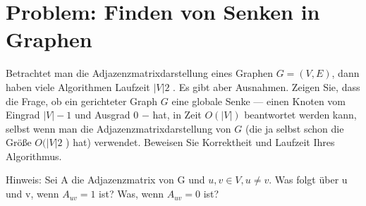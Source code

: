 \section{Problem: Finden von Senken in Graphen}

Betrachtet man die Adjazenzmatrixdarstellung eines Graphen $G = (V, E)$, dann
haben viele Algorithmen Laufzeit $|V|2$ . Es gibt aber Ausnahmen. Zeigen Sie, dass
die Frage, ob ein gerichteter Graph $G$ eine globale Senke — einen Knoten vom
Eingrad $|V | - 1$ und Ausgrad 0 $-$ hat, in Zeit $O(|V|)$ beantwortet werden kann,
selbst wenn man die Adjazenzmatrixdarstellung von $G$ (die ja selbst schon die Größe
$O(|V|2$ ) hat) verwendet. Beweisen Sie Korrektheit und Laufzeit Ihres Algorithmus.

Hinweis: Sei A die Adjazenzmatrix von G und $u, v \in V , u \neq v$. Was folgt über u
und v, wenn $A_{uv} = 1$ ist? Was, wenn $A_{uv} = 0$ ist?